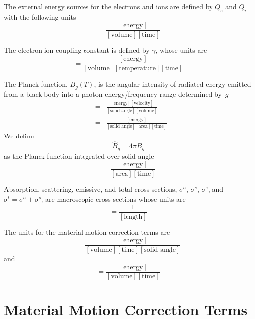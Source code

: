 \documentclass{article}
\newcommand{\Bg}{\ensuremath{\hat{B}_{g}}}
\newcommand{\units}[1]{\ensuremath{[\mbox{#1}]}}
\begin{document}
The external energy sources for the electrons and ions are defined by
$Q_{e}$ and $Q_{i}$ with the following units
\begin{equation}
	[Q] = \frac{\units{energy}}{\units{volume}\units{time}}
\end{equation}

The electron-ion coupling constant is defined by $\gamma$, whose units are
\begin{equation}
	[\gamma] = \frac{\units{energy}}{\units{volume}\units{temperature}
			                 \units{time}}
\end{equation}

The Planck function, $B_{g}(T)$, is the angular intensity
of radiated energy emitted from a 
black body into a photon energy/frequency range determined by~$g$
\begin{eqnarray}
	[B_{g}] &=& \frac{\units{energy} \units{velocity}}
		         {\units{solid angle} \units{volume}} \\
	        &=& \frac{\units{energy}}
		         {\units{solid angle} \units{area} \units{time}}
\end{eqnarray}
We define
\begin{equation}
   \Bg = 4\pi B_{g}
\end{equation}
 as the Planck function integrated over solid angle
\begin{equation}
	[\Bg] = \frac{\units{energy}}
	             {\units{area} \units{time}}
\end{equation}

Absorption, scattering, emissive, and total cross sections, $\sigma^{a}$,
$\sigma^{s}$, $\sigma^{e}$, and $\sigma^{t} = \sigma^{a} + \sigma^{s}$,
are macroscopic cross sections whose units are
\begin{equation}
	[\sigma] = \frac{1}{\units{length}}
\end{equation}

The units for the material motion correction terms are
\begin{equation}
	[\xi] = \frac{\units{energy}}
		     {\units{volume} \units{time} \units{solid angle}}
\end{equation}
and
\begin{equation}
	[\tilde{\xi}] = \frac{\units{energy}}
		             {\units{volume} \units{time}}
\end{equation}

\section{Material Motion Correction Terms}
\end{document}
